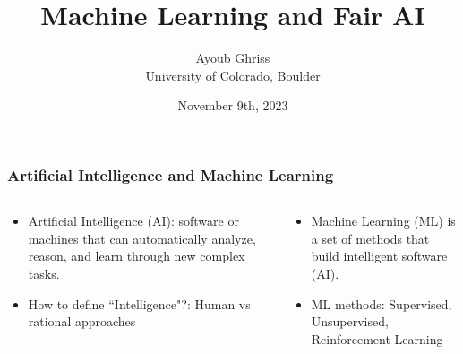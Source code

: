 \documentclass[aspectratio=169]{beamer}
\title{Machine Learning and Fair AI}
\author{Ayoub Ghriss\\ University of Colorado, Boulder}
\date{November 9th, 2023}
\begin{document}
\frame{\titlepage}


\begin{frame}
	\frametitle{Artificial Intelligence and Machine Learning}
	\begin{columns}
		\begin{column}{0.5\textwidth}
			\begin{itemize}
				\item Artificial Intelligence (AI): software or machines that can
				      automatically analyze, reason, and learn through new complex
				      tasks.
				\item How to define ``Intelligence"?: Human vs rational approaches
			\end{itemize}
		\end{column}
		\begin{column}{0.5\textwidth}
			\begin{itemize}
				\item Machine Learning (ML) is a set of methods that build
				      intelligent software (AI).
				\item ML methods: Supervised, Unsupervised, Reinforcement Learning
			\end{itemize}
		\end{column}
	\end{columns}
\end{frame}
\end{document}
